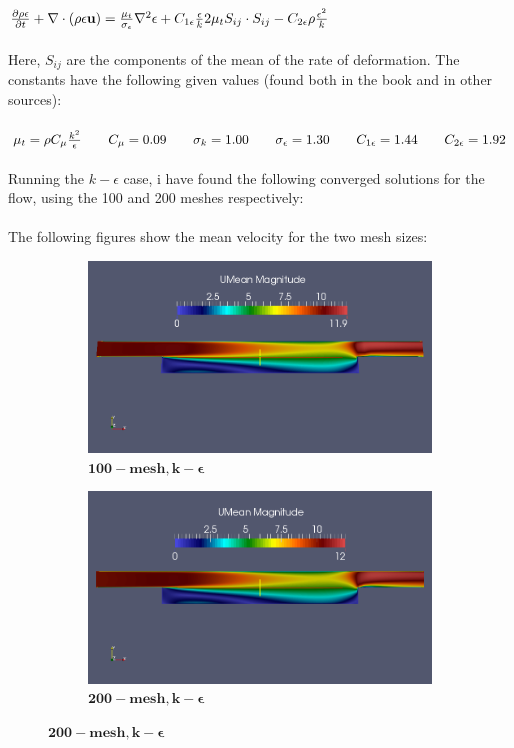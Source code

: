 \documentclass[a4paper,english,12pt,twoside]{article}
\newcommand{\tab}{\hspace*{2em}}
\begin{document}
$\frac{\partial \rho \epsilon}{\partial t} + \nabla\cdot(\rho \epsilon \mathbf{u}) = \frac{\mu_t}{\sigma_{\epsilon}}\nabla^2\epsilon + C_{1\epsilon}\frac{\epsilon}{k}2\mu_t S_{ij}\cdot S_{ij} - C_{2\epsilon}\rho\frac{\epsilon^2}{k}$\\
\\
Here, $S_{ij}$ are the components of the mean of the rate of deformation. The constants have the following given values (found both in the book and in other sources):\\
\\
$\mu_t = \rho C_{\mu}\frac{k^2}{\epsilon}\tab C_{\mu} = 0.09\tab\sigma_k = 1.00\tab\sigma_{\epsilon} = 1.30\tab C_{1\epsilon} = 1.44\tab C_{2\epsilon} = 1.92$
\\
\\
Running the $k-\epsilon$ case, i have found the following converged solutions for the flow, using the 100 and 200 meshes respectively:\\
\\
The following figures show the mean velocity for the two mesh sizes:\\
\begin{figure}[h!]
	\begin{subfigure}{0.5\textwidth}
		\includegraphics[width=0.95\linewidth]{simple_ke_10_mean_u.png}
		\caption{$\mathbf{100-mesh, k-\epsilon}$}
	\end{subfigure}
	\begin{subfigure}{0.5\textwidth}
		\includegraphics[width=0.95\linewidth]{simple_ke_20_mean_u.png}
		\caption{$\mathbf{200-mesh, k-\epsilon}$}
	\end{subfigure}
\end{figure}
\end{document}
